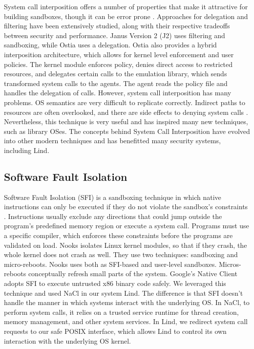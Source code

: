 System call interposition offers a number of properties that make it attractive for building sandboxes, 
though it can be error prone \cite{SCI-04}. Approaches for delegation and filtering have been extensively studied, 
along with their respective tradeoffs between security and performance. 
Janus Version 2 (J2) \cite{Janus0:96, Janus:99} uses filtering and sandboxing, while Ostia \cite{SCI-04} uses a delegation. 
Ostia also provides a hybrid interposition architecture, which allows for kernel level enforcement and user policies. 
The kernel module enforces policy, denies direct access to restricted resources, 
and delegates certain calls to the emulation library, which sends transformed system calls to the agents. 
The agent reads the policy file and handles the delegation of calls. However, system call interposition has many problems. 
OS semantics are very difficult to replicate correctly. Indirect paths to resources are often overlooked, 
and there are side effects to denying system calls \cite{Problems-SCI}. 
Nevertheless, this technique is very useful and has inspired many new techniques, such as library OSes. 
The concepts behind System Call Interposition have evolved into other modern techniques 
and has benefitted many security systems, including Lind. 

\subsection{Software Fault Isolation}
Software Fault Isolation (SFI) is a sandboxing technique in which native instructions can only be executed 
if they do not violate the sandbox's constraints \cite{SFI:93}. Instructions usually exclude any directions that 
could jump outside the program's predefined memory region or execute a system call. 
Programs must use a specific compiler, which enforces these constraints before the programs are validated on load. 
Nooks \cite{Nooks:03} isolates Linux kernel modules, so that if they crash, the whole kernel does not crash as well. 
They use two techniques: sandboxing and micro-reboots. Nooks uses both as SFI-based and user-level sandboxes. 
Micros-reboots conceptually refresh small parts of the system. 
Google's Native Client \cite{NaCl-09} adopts SFI to execute untrusted x86 binary code safely. 
We leveraged this technique and used NaCl in our system Lind. The difference is that SFI doesn't handle the manner 
in which systems interact with the underlying OS. In NaCl, to perform system calls, 
it relies on a trusted service runtime for thread creation, memory management, and other system services. 
In Lind, we redirect system call requests to our safe POSIX interface, 
which allows Lind to control its own interaction with the underlying OS kernel.
